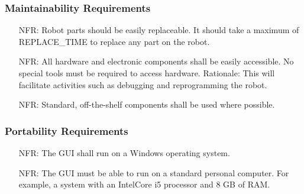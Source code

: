 \documentclass[12pt]{article}
\newcounter{nfrnum} %
\begin{document}
\subsubsection{Maintainability Requirements}

\noindent \begin{itemize}
\item[NFR\refstepcounter{nfrnum}\thenfrnum \label{NFR_Maintainability1}:] Robot parts should be easily replaceable. It should take a maximum of REPLACE\_TIME to replace any part on the robot.
\item[NFR\refstepcounter{nfrnum}\thenfrnum \label{NFR_Maintainability2}:] All hardware and electronic components shall be easily accessible. No special tools must be required to access hardware. 
\newline Rationale: This will facilitate activities such as debugging and reprogramming the robot. 
\item[NFR\refstepcounter{nfrnum}\thenfrnum \label{NFR_Maintainability3}:] Standard, off-the-shelf components shall be used where possible. 
\end{itemize}

\subsubsection{Portability Requirements}

\noindent \begin{itemize}
\item[NFR\refstepcounter{nfrnum}\thenfrnum \label{NFR_Portability1}:] The GUI shall run on a Windows operating system.
\item[NFR\refstepcounter{nfrnum}\thenfrnum \label{NFR_Portability2}:] The GUI must be able to run on a standard personal computer. For example, a system with an IntelCore i5 processor and 8 GB of RAM.
\end{itemize}
\end{document}
